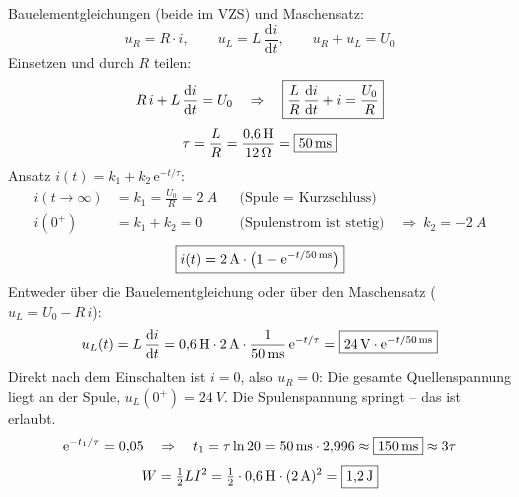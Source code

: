 \documentclass[11pt,a4paper]{article}
\begin{document}
\begin{loesung}
Bauelementgleichungen (beide im VZS) und Maschensatz:
\[
  u_R = R\cdot i, \qquad u_L = L\,\frac{\mathrm{d}i}{\mathrm{d}t}, \qquad u_R + u_L = U_0
\]
Einsetzen und durch $R$ teilen:
\[
  R\,i + L\,\frac{\mathrm{d}i}{\mathrm{d}t} = U_0
  \quad\Rightarrow\quad \boxed{\frac{L}{R}\,\frac{\mathrm{d}i}{\mathrm{d}t} + i = \frac{U_0}{R}}
\]
\[
  \tau = \frac{L}{R} = \frac{\SI{0.6}{H}}{\SI{12}{\ohm}} = \boxed{\SI{50}{ms}}
\]
Ansatz $i(t) = k_1 + k_2\,\mathrm{e}^{-t/\tau}$:
\begin{align*}
  i(t\to\infty) &= k_1 = \frac{U_0}{R} = \SI{2}{A} && \text{(Spule = Kurzschluss)}\\
  i(0^+) &= k_1 + k_2 = 0 && \text{(Spulenstrom ist stetig)}\quad\Rightarrow\ k_2 = \SI{-2}{A}
\end{align*}
\[
  \boxed{i(t) = \SI{2}{A}\cdot\bigl(1 - \mathrm{e}^{-t/\SI{50}{ms}}\bigr)}
\]
Entweder über die Bauelementgleichung oder über den Maschensatz ($u_L = U_0 - R\,i$):
\[
  u_L(t) = L\,\frac{\mathrm{d}i}{\mathrm{d}t} = \SI{0.6}{H}\cdot\SI{2}{A}\cdot\frac{1}{\SI{50}{ms}}\,\mathrm{e}^{-t/\tau}
  = \boxed{\SI{24}{V}\cdot\mathrm{e}^{-t/\SI{50}{ms}}}
\]
Direkt nach dem Einschalten ist $i = 0$, also $u_R = 0$: Die gesamte Quellenspannung liegt an der Spule, $u_L(0^+) = \SI{24}{V}$. Die Spulenspannung springt -- das ist erlaubt.
\[
  \mathrm{e}^{-t_1/\tau} = 0{,}05 \quad\Rightarrow\quad t_1 = \tau\ln 20 = \SI{50}{ms}\cdot 2{,}996 \approx \boxed{\SI{150}{ms}} \approx 3\tau
\]
\[
  W = \tfrac12 L I^2 = \tfrac12\cdot\SI{0.6}{H}\cdot(\SI{2}{A})^2 = \boxed{\SI{1.2}{J}}
\]
\begin{center}


\end{center}
\end{loesung}
\end{document}
